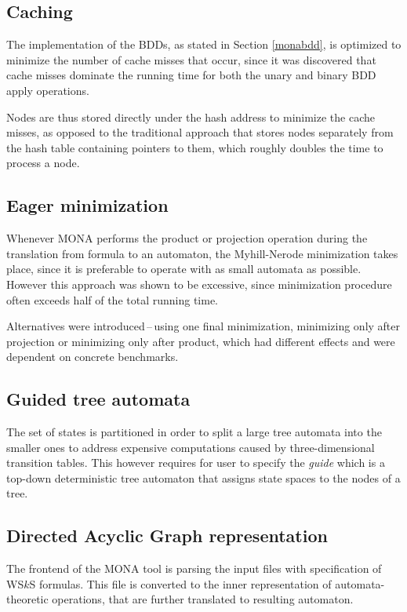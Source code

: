 \subsection{Caching}
The implementation of the BDDs, as stated in Section \ref{monabdd}, is optimized to minimize the number of cache misses that occur, since it was discovered that cache misses dominate the running time for both the unary and binary BDD apply operations.

Nodes are thus stored directly under the hash address to minimize the cache misses, as opposed to the traditional approach that stores nodes separately from the hash table containing pointers to them, which roughly doubles the time to process a node. 

\subsection{Eager minimization}
Whenever MONA performs the product or projection operation during the translation from formula to an automaton, the Myhill-Nerode minimization takes place, since it is preferable to operate with as small automata as possible. However this approach was shown to be excessive, since minimization procedure often exceeds half of the total running time.

Alternatives were introduced\,--\,using one final minimization, minimizing only after projection or minimizing only after product, which had different effects and were dependent on concrete benchmarks.

\subsection{Guided tree automata}

The set of states is partitioned in order to split a large tree automata into the smaller ones to address expensive computations caused by three-dimensional transition tables. This however requires for user to specify the \emph{guide} which is a top-down deterministic tree automaton that assigns state spaces to the nodes of a tree.

\subsection{Directed Acyclic Graph representation}\label{dag}

The frontend of the MONA tool is parsing the input files with specification of WS$k$S formulas. This file is converted to the inner representation of automata-theoretic operations, that are further translated to resulting automaton. 

